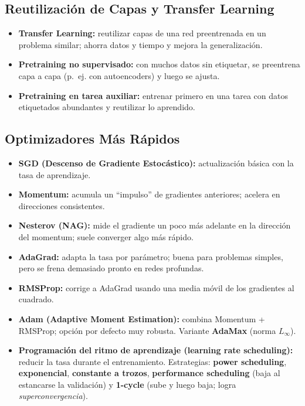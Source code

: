 \documentclass[12pt]{book} %
\providecommand{\tightlist}{%
  \setlength{\itemsep}{0pt}\setlength{\parskip}{0pt}}
\begin{document}
\hypertarget{reutilizaciuxf3n-de-capas-y-transfer-learning}{%
\subsection{Reutilización de Capas y Transfer
Learning}\label{reutilizaciuxf3n-de-capas-y-transfer-learning}}

\begin{itemize}
\tightlist
\item
  \textbf{Transfer Learning:} reutilizar capas de una red preentrenada
  en un problema similar; ahorra datos y tiempo y mejora la
  generalización.
\item
  \textbf{Pretraining no supervisado:} con muchos datos sin etiquetar,
  se preentrena capa a capa (p.~ej. con autoencoders) y luego se ajusta.
\item
  \textbf{Pretraining en tarea auxiliar:} entrenar primero en una tarea
  con datos etiquetados abundantes y reutilizar lo aprendido.
\end{itemize}

\hypertarget{optimizadores-muxe1s-ruxe1pidos}{%
\subsection{Optimizadores Más
Rápidos}\label{optimizadores-muxe1s-ruxe1pidos}}

\begin{itemize}
\tightlist
\item
  \textbf{SGD (Descenso de Gradiente Estocástico):} actualización básica
  con la tasa de aprendizaje.
\item
  \textbf{Momentum:} acumula un ``impulso'' de gradientes anteriores;
  acelera en direcciones consistentes.
\item
  \textbf{Nesterov (NAG):} mide el gradiente un poco más adelante en la
  dirección del momentum; suele converger algo más rápido.
\item
  \textbf{AdaGrad:} adapta la tasa por parámetro; buena para problemas
  simples, pero se frena demasiado pronto en redes profundas.
\item
  \textbf{RMSProp:} corrige a AdaGrad usando una media móvil de los
  gradientes al cuadrado.
\item
  \textbf{Adam (Adaptive Moment Estimation):} combina Momentum +
  RMSProp; opción por defecto muy robusta. Variante \textbf{AdaMax}
  (norma \(L_\infty\)).
\item
  \textbf{Programación del ritmo de aprendizaje (learning rate
  scheduling):} reducir la tasa durante el entrenamiento. Estrategias:
  \textbf{power scheduling}, \textbf{exponencial}, \textbf{constante a
  trozos}, \textbf{performance scheduling} (baja al estancarse la
  validación) y \textbf{1-cycle} (sube y luego baja; logra
  \emph{superconvergencia}).
\end{itemize}
\end{document}

